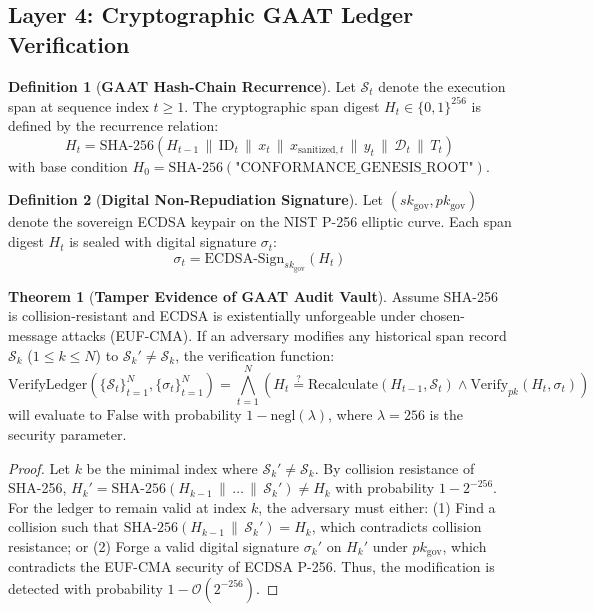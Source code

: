 \documentclass[11pt,a4paper]{article}
\theoremstyle{definition}
\newtheorem{definition}{Definition}
\newtheorem{theorem}{Theorem}
\begin{document}
\subsection{Layer 4: Cryptographic GAAT Ledger Verification}

\begin{definition}[\textbf{GAAT Hash-Chain Recurrence}]
Let $\mathcal{S}_t$ denote the execution span at sequence index $t \ge 1$. The cryptographic span digest $H_t \in \{0, 1\}^{256}$ is defined by the recurrence relation:
\begin{equation}
    H_t = \text{SHA-256}\left( H_{t-1} \,\|\, \text{ID}_t \,\|\, x_t \,\|\, x_{\text{sanitized}, t} \,\|\, y_t \,\|\, \mathcal{D}_t \,\|\, T_t \right)
\end{equation}
with base condition $H_0 = \text{SHA-256}(\text{"CONFORMANCE\_GENESIS\_ROOT"})$.
\end{definition}

\begin{definition}[\textbf{Digital Non-Repudiation Signature}]
Let $(sk_{\text{gov}}, pk_{\text{gov}})$ denote the sovereign ECDSA keypair on the NIST P-256 elliptic curve. Each span digest $H_t$ is sealed with digital signature $\sigma_t$:
\begin{equation}
    \sigma_t = \text{ECDSA-Sign}_{sk_{\text{gov}}}(H_t)
\end{equation}
\end{definition}

\begin{theorem}[\textbf{Tamper Evidence of GAAT Audit Vault}]
Assume SHA-256 is collision-resistant and ECDSA is existentially unforgeable under chosen-message attacks (EUF-CMA). If an adversary modifies any historical span record $\mathcal{S}_k$ ($1 \le k \le N$) to $\mathcal{S}_k' \ne \mathcal{S}_k$, the verification function:
\begin{equation}
    \text{VerifyLedger}(\{\mathcal{S}_t\}_{t=1}^N, \{\sigma_t\}_{t=1}^N) = \bigwedge_{t=1}^N \left( H_t \stackrel{?}{=} \text{Recalculate}(H_{t-1}, \mathcal{S}_t) \land \text{Verify}_{pk}(H_t, \sigma_t) \right)
\end{equation}
will evaluate to $\text{False}$ with probability $1 - \text{negl}(\lambda)$, where $\lambda = 256$ is the security parameter.
\end{theorem}

\begin{proof}
Let $k$ be the minimal index where $\mathcal{S}_k' \ne \mathcal{S}_k$. By collision resistance of SHA-256, $H_k' = \text{SHA-256}(H_{k-1} \,\|\, \dots \,\|\, \mathcal{S}_k') \ne H_k$ with probability $1 - 2^{-256}$. For the ledger to remain valid at index $k$, the adversary must either:
(1) Find a collision such that $\text{SHA-256}(H_{k-1} \,\|\, \mathcal{S}_k') = H_k$, which contradicts collision resistance; or
(2) Forge a valid digital signature $\sigma_k'$ on $H_k'$ under $pk_{\text{gov}}$, which contradicts the EUF-CMA security of ECDSA P-256. 
Thus, the modification is detected with probability $1 - \mathcal{O}(2^{-256})$.
\end{proof}
\end{document}
